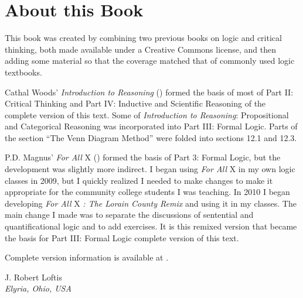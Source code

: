 
\setlength{\parindent}{1em}
\chapter{About this Book}

This book was created by combining two previous books on logic and critical thinking, both made available under a Creative Commons license, and then adding some material so that the coverage matched that of commonly used logic textbooks.

Cathal Woods' \textit{Introduction to Reasoning} (\citeyear{Woods2014}) formed the basis of most of Part II: Critical Thinking and Part IV: Inductive and Scientific Reasoning of the complete version of this text. \nix{[Details]} Some of \textit{Introduction to Reasoning}: Propositional and Categorical Reasoning was incorporated into Part III: Formal Logic. Parts of the section ``The Venn Diagram Method'' were folded into sections 12.1 and 12.3.%

P.D. Magnus' \textit{For All} X (\citeyear{Magnus2008}) formed the basis of Part 3: Formal Logic, but the development was slightly more indirect. I began using \textit{For All} X in my own logic classes in 2009, but I quickly realized I needed to make changes to make it appropriate for the community college students I was teaching. In 2010 I began developing \textit{For All} X \textit{: The Lorain County Remix} and using it in my classes. The main change I made was to separate the discussions of sentential and quantificational logic and to add exercises. It is this remixed version that became the basis for Part III: Formal Logic complete version of this text. 

 Complete version information is available at \textbookhomepage.


 \begin{adjustwidth}{2em}{0em} 
 J. Robert Loftis \\
\noindent \emph{Elyria, Ohio, USA} 
\end{adjustwidth}

